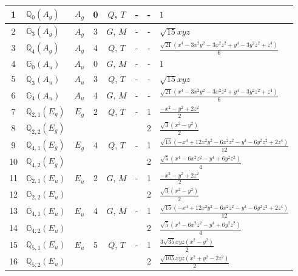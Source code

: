 \documentclass[fleqn,10pt,landscape]{jsarticle}
\begin{document}
\begin{longtable}[l]{clcccccl}
1 & $\mathbb{Q}_{0}(A_{g})$ & $A_{g}$ & 0 & $Q$, $T$ & - & - & $1$ \\ \hline
2 & $\mathbb{G}_{3}(A_{g})$ & $A_{g}$ & 3 & $G$, $M$ & - & - & $\sqrt{15} x y z$ \\ \hline
3 & $\mathbb{Q}_{4}(A_{g})$ & $A_{g}$ & 4 & $Q$, $T$ & - & - & $\frac{\sqrt{21} \left(x^{4} - 3 x^{2} y^{2} - 3 x^{2} z^{2} + y^{4} - 3 y^{2} z^{2} + z^{4}\right)}{6}$ \\ \hline
4 & $\mathbb{G}_{0}(A_{u})$ & $A_{u}$ & 0 & $G$, $M$ & - & - & $1$ \\ \hline
5 & $\mathbb{Q}_{3}(A_{u})$ & $A_{u}$ & 3 & $Q$, $T$ & - & - & $\sqrt{15} x y z$ \\ \hline
6 & $\mathbb{G}_{4}(A_{u})$ & $A_{u}$ & 4 & $G$, $M$ & - & - & $\frac{\sqrt{21} \left(x^{4} - 3 x^{2} y^{2} - 3 x^{2} z^{2} + y^{4} - 3 y^{2} z^{2} + z^{4}\right)}{6}$ \\ \hline
7 & $\mathbb{Q}_{2,1}(E_{g})$ & $E_{g}$ & 2 & $Q$, $T$ & - & 1 & $\frac{- x^{2} - y^{2} + 2 z^{2}}{2}$ \\
8 & $\mathbb{Q}_{2,2}(E_{g})$ &  &  &  &  & 2 & $\frac{\sqrt{3} \left(x^{2} - y^{2}\right)}{2}$ \\ \hline
9 & $\mathbb{Q}_{4,1}(E_{g})$ & $E_{g}$ & 4 & $Q$, $T$ & - & 1 & $\frac{\sqrt{15} \left(- x^{4} + 12 x^{2} y^{2} - 6 x^{2} z^{2} - y^{4} - 6 y^{2} z^{2} + 2 z^{4}\right)}{12}$ \\
10 & $\mathbb{Q}_{4,2}(E_{g})$ &  &  &  &  & 2 & $\frac{\sqrt{5} \left(x^{4} - 6 x^{2} z^{2} - y^{4} + 6 y^{2} z^{2}\right)}{4}$ \\ \hline
11 & $\mathbb{G}_{2,1}(E_{u})$ & $E_{u}$ & 2 & $G$, $M$ & - & 1 & $\frac{- x^{2} - y^{2} + 2 z^{2}}{2}$ \\
12 & $\mathbb{G}_{2,2}(E_{u})$ &  &  &  &  & 2 & $\frac{\sqrt{3} \left(x^{2} - y^{2}\right)}{2}$ \\ \hline
13 & $\mathbb{G}_{4,1}(E_{u})$ & $E_{u}$ & 4 & $G$, $M$ & - & 1 & $\frac{\sqrt{15} \left(- x^{4} + 12 x^{2} y^{2} - 6 x^{2} z^{2} - y^{4} - 6 y^{2} z^{2} + 2 z^{4}\right)}{12}$ \\
14 & $\mathbb{G}_{4,2}(E_{u})$ &  &  &  &  & 2 & $\frac{\sqrt{5} \left(x^{4} - 6 x^{2} z^{2} - y^{4} + 6 y^{2} z^{2}\right)}{4}$ \\ \hline
15 & $\mathbb{Q}_{5,1}(E_{u})$ & $E_{u}$ & 5 & $Q$, $T$ & - & 1 & $\frac{3 \sqrt{35} x y z \left(x^{2} - y^{2}\right)}{2}$ \\
16 & $\mathbb{Q}_{5,2}(E_{u})$ &  &  &  &  & 2 & $\frac{\sqrt{105} x y z \left(x^{2} + y^{2} - 2 z^{2}\right)}{2}$ \\ \hline

\end{longtable}
\end{document}
